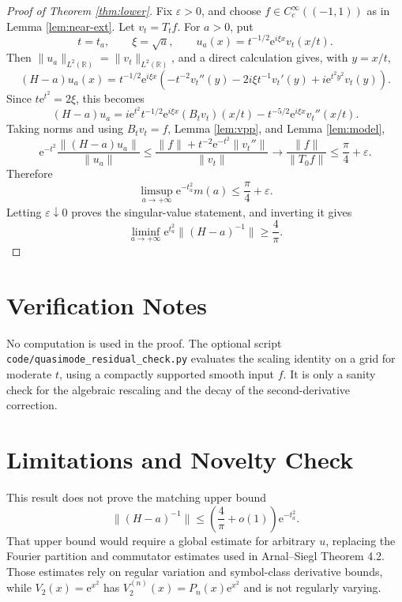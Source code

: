 \documentclass[11pt]{article}
\newcommand{\R}{\mathbb R}
\newcommand{\e}{\mathrm e}
\begin{document}
\begin{proof}[Proof of Theorem \ref{thm:lower}]
Fix \(\varepsilon>0\), and choose \(f\in C_c^\infty((-1,1))\) as in
Lemma \ref{lem:near-ext}.  Let \(v_t=T_tf\).  For \(a>0\), put
\[
    t=t_a,\qquad \xi=\sqrt a,\qquad
    u_a(x)=t^{-1/2}\e^{i\xi x}v_t(x/t).
\]
Then \(\|u_a\|_{L^2(\R)}=\|v_t\|_{L^2(\R)}\), and a direct calculation gives,
with \(y=x/t\),
\[
    (H-a)u_a(x)
    =t^{-1/2}\e^{i\xi x}
      \left(-t^{-2}v_t''(y)-2i\xi t^{-1}v_t'(y)
            +i\e^{t^2y^2}v_t(y)\right).
\]
Since \(t\e^{t^2}=2\xi\), this becomes
\[
    (H-a)u_a
    =i\e^{t^2}t^{-1/2}\e^{i\xi x}(B_tv_t)(x/t)
      -t^{-5/2}\e^{i\xi x}v_t''(x/t).
\]
Taking norms and using \(B_tv_t=f\), Lemma \ref{lem:vpp}, and
Lemma \ref{lem:model},
\[
    \e^{-t^2}\frac{\|(H-a)u_a\|}{\|u_a\|}
       \le
       \frac{\|f\|+t^{-2}\e^{-t^2}\|v_t''\|}{\|v_t\|}
       \longrightarrow
       \frac{\|f\|}{\|T_0f\|}
       \le \frac\pi4+\varepsilon.
\]
Therefore
\[
    \limsup_{a\to+\infty}\e^{-t_a^2}m(a)\le \frac\pi4+\varepsilon.
\]
Letting \(\varepsilon\downarrow0\) proves the singular-value statement, and
inverting it gives
\[
    \liminf_{a\to+\infty}\e^{t_a^2}\|(H-a)^{-1}\|\ge\frac4\pi.
\]
\end{proof}

\section*{Verification Notes}

No computation is used in the proof.  The optional script
\texttt{code/quasimode\_residual\_check.py} evaluates the scaling identity on
a grid for moderate \(t\), using a compactly supported smooth input \(f\).  It
is only a sanity check for the algebraic rescaling and the decay of the
second-derivative correction.

\section*{Limitations and Novelty Check}

This result does not prove the matching upper bound
\[
    \|(H-a)^{-1}\|\le \left(\frac4\pi+o(1)\right)\e^{-t_a^2}.
\]
That upper bound would require a global estimate for arbitrary \(u\), replacing
the Fourier partition and commutator estimates used in Arnal--Siegl Theorem
4.2.  Those estimates rely on regular variation and symbol-class derivative
bounds, while \(V_2(x)=\e^{x^2}\) has \(V_2^{(n)}(x)=P_n(x)\e^{x^2}\) and is
not regularly varying.
\end{document}

